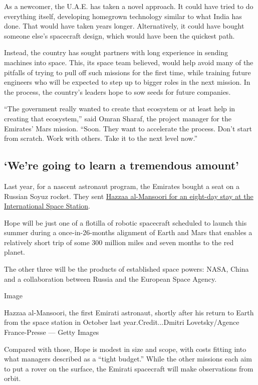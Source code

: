 As a newcomer, the U.A.E. has taken a novel approach. It could have
tried to do everything itself, developing homegrown technology similar
to what India has done. That would have taken years longer.
Alternatively, it could have bought someone else's spacecraft design,
which would have been the quickest path.

Instead, the country has sought partners with long experience in sending
machines into space. This, its space team believed, would help avoid
many of the pitfalls of trying to pull off such missions for the first
time, while training future engineers who will be expected to step up to
bigger roles in the next mission. In the process, the country's leaders
hope to sow seeds for future companies.

``The government really wanted to create that ecosystem or at least help
in creating that ecosystem,'' said Omran Sharaf, the project manager for
the Emirates' Mars mission. ``Soon. They want to accelerate the process.
Don't start from scratch. Work with others. Take it to the next level
now.''

\hypertarget{were-going-to-learn-a-tremendous-amount}{%
\subsection{`We're going to learn a tremendous
amount'}\label{were-going-to-learn-a-tremendous-amount}}

Last year, for a nascent astronaut program, the Emirates bought a seat
on a Russian Soyuz rocket. They sent
\href{https://www.nytimes3xbfgragh.onion/2019/09/25/science/emirati-astronaut-uae-international-space-station.html}{Hazzaa
al-Mansoori for an eight-day stay at the International Space Station}.

Hope will be just one of a flotilla of robotic spacecraft scheduled to
launch this summer during a once-in-26-months alignment of Earth and
Mars that enables a relatively short trip of some 300 million miles and
seven months to the red planet.

The other three will be the products of established space powers: NASA,
China and a collaboration between Russia and the European Space Agency.

Image

Hazzaa al-Mansoori, the first Emirati astronaut, shortly after his
return to Earth from the space station in October last
year.Credit...Dmitri Lovetsky/Agence France-Presse --- Getty Images

Compared with those, Hope is modest in size and scope, with costs
fitting into what managers described as a ``tight budget.'' While the
other missions each aim to put a rover on the surface, the Emirati
spacecraft will make observations from orbit.

